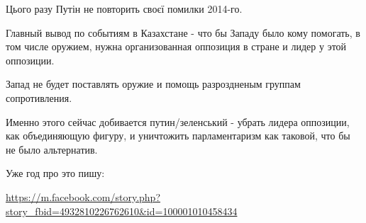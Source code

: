 \begin{itemize}
Цього разу Путін не повторить своєї помилки 2014-го.

Главный вывод по событиям в Казахстане - что бы Западу было кому помогать, в
том числе оружием, нужна организованная оппозиция в стране и лидер у этой
оппозиции.

Запад не будет поставлять оружие и помощь разроздненым группам сопротивления.

Именно этого сейчас добивается путин/зеленський - убрать лидера оппозиции, как
объединяющую фигуру, и уничтожить парламентаризм как таковой, что бы не было
альтернатив.

Уже год про это пишу:

\url{https://m.facebook.com/story.php?story_fbid=4932810226762610&id=100001010458434}


\end{itemize} %

